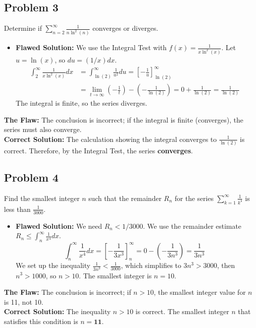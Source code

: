 \documentclass{article}
\begin{document}
\subsection*{Problem 3}
Determine if $\sum_{n=2}^\infty \frac{1}{n \ln^2(n)}$ converges or diverges.
\begin{itemize}
    \item \textbf{Flawed Solution:} We use the Integral Test with $f(x) = \frac{1}{x \ln^2(x)}$. Let $u = \ln(x)$, so $du = (1/x) dx$.
    \begin{align*}
        \int_2^\infty \frac{1}{x \ln^2(x)} dx &= \int_{\ln(2)}^\infty \frac{1}{u^2} du = [-\frac{1}{u}]_{\ln(2)}^\infty \\
        &= \lim_{t\to\infty} (-\frac{1}{t}) - (-\frac{1}{\ln(2)}) = 0 + \frac{1}{\ln(2)} = \frac{1}{\ln(2)}
    \end{align*}
    The integral is finite, so the series diverges.
\end{itemize}
\textbf{The Flaw:} The conclusion is incorrect; if the integral is finite (converges), the series must also converge. \\
\textbf{Correct Solution:} The calculation showing the integral converges to $\frac{1}{\ln(2)}$ is correct. Therefore, by the Integral Test, the series \textbf{converges}.

\subsection*{Problem 4}
Find the smallest integer $n$ such that the remainder $R_n$ for the series $\sum_{k=1}^\infty \frac{1}{k^4}$ is less than $\frac{1}{3000}$.
\begin{itemize}
    \item \textbf{Flawed Solution:} We need $R_n < 1/3000$. We use the remainder estimate $R_n \le \int_n^\infty \frac{1}{x^4} dx$.
    \[ \int_n^\infty \frac{1}{x^4} dx = [-\frac{1}{3x^3}]_n^\infty = 0 - (-\frac{1}{3n^3}) = \frac{1}{3n^3} \]
    We set up the inequality $\frac{1}{3n^3} < \frac{1}{3000}$, which simplifies to $3n^3 > 3000$, then $n^3 > 1000$, so $n>10$. The smallest integer is $n=10$.
\end{itemize}
\textbf{The Flaw:} The conclusion is incorrect; if $n>10$, the smallest integer value for $n$ is 11, not 10. \\
\textbf{Correct Solution:} The inequality $n>10$ is correct. The smallest integer $n$ that satisfies this condition is $n=\textbf{11}$.
\end{document}
